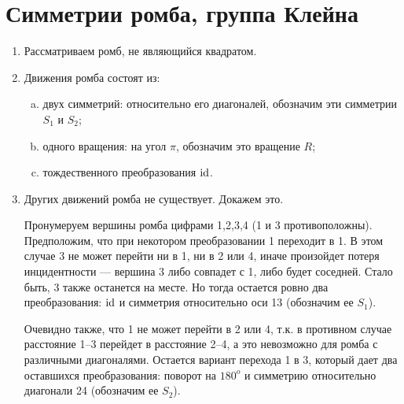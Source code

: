 \section{Симметрии ромба, группа Клейна}


\begin{enumerate}
\item Рассматриваем ромб, не являющийся квадратом.
\item Движения ромба состоят из:
\begin{enumerate}[a)]
\item двух симметрий: относительно его диагоналей, обозначим эти симметрии $S_1$ и $S_2$;
\item одного вращения: на угол $\pi$, обозначим это вращение $R$;
\item тождественного преобразования $\mathrm{id}$.
\end{enumerate}
\item Других движений ромба не существует. Докажем это.

Пронумеруем вершины ромба цифрами 1,2,3,4 (1 и 3 противоположны). Предположим, что при некотором преобразовании 1 переходит в 1. В этом случае 3 не может перейти ни в 1, ни в 2 или 4, иначе произойдет потеря инцидентности --- вершина 3 либо совпадет с 1, либо будет соседней. Стало быть, 3 также останется на месте. Но тогда остается ровно два преобразования: $\mathrm{id}$ и симметрия относительно оси 13 (обозначим ее $S_1$).

Очевидно также, что 1 не может перейти в 2 или 4, т.к. в противном случае расстояние 1--3 перейдет в расстояние 2--4, а это невозможно для ромба с различными диагоналями. Остается вариант перехода 1 в 3, который дает два оставшихся преобразования: поворот на $180^o$ и симметрию относительно диагонали 24 (обозначим ее $S_2$).


\end{enumerate}
